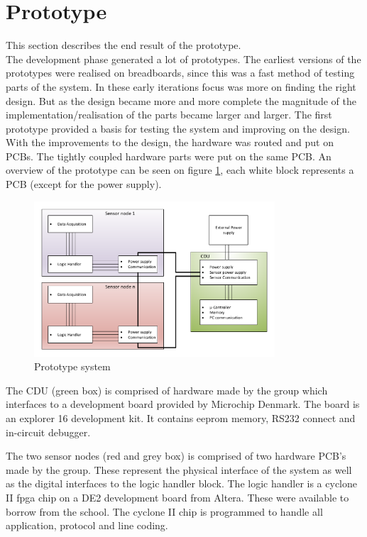 \section{Prototype}
This section describes the end result of the prototype.\\
The development phase generated a lot of prototypes. The earliest versions of the prototypes were realised on breadboards, since this was a fast method of testing parts of the system. In these early iterations focus was more on finding the right design. But as the design became more and more complete the magnitude of the implementation/realisation of the parts became larger and larger. The first prototype provided a basis for testing the system and improving on the design. With the improvements to the design, the hardware was routed and put on PCBs. The tightly coupled hardware parts were put on the same PCB. An overview of the prototype can be seen on figure \ref{fig:prototype}, each white block represents a PCB (except for the power supply).
\begin{figure}[H]
	\centering
	\includegraphics[width=0.8\textwidth]{billeder/11ProjectDescription/prototypesystem}
	\caption{Prototype system}
	\label{fig:prototype}
\end{figure}
The CDU (green box) is comprised of hardware made by the group which interfaces to a development board provided by Microchip Denmark. The board is an explorer 16 development kit. It contains eeprom memory, RS232 connect and in-circuit debugger.

The two sensor nodes (red and grey box) is comprised of two hardware PCB's made by the group. These represent the physical interface of the system as well as the digital interfaces to the logic handler block. The logic handler is a cyclone II fpga chip on a DE2 development board from Altera. These were available to borrow from the school. The cyclone II chip is programmed to handle all application, protocol and line coding.

